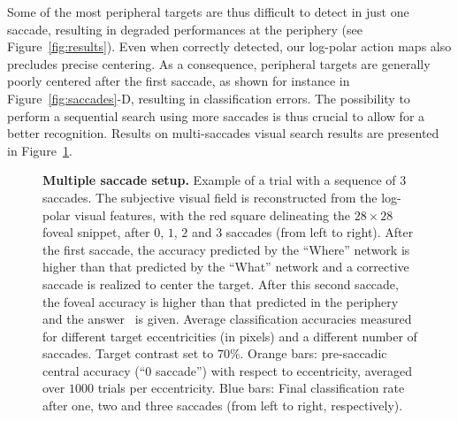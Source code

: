 Some of the most peripheral targets are thus difficult to detect in just one saccade, resulting in degraded performances at the periphery (see Figure~\ref{fig:results}). Even when correctly detected, our log-polar action maps also precludes precise centering. As a consequence, peripheral targets are generally poorly centered after the first saccade, as shown for instance in Figure~\ref{fig:saccades}-D, resulting in classification errors. The possibility to perform a sequential search using more saccades is thus crucial to allow for a better recognition. Results on multi-saccades visual search results are presented in Figure~\ref{fig:results-saccades}.

\begin{figure}[t!]%
	\caption{
		{\bf Multiple saccade setup.} %
		\A Example of a trial with a sequence of $3$ saccades. The subjective visual field is reconstructed from the log-polar visual features, with the red square delineating the $28\times28$ foveal snippet, after $0$, $1$, $2$ and $3$ saccades (from left to right). After the first saccade, the accuracy predicted by the ``Where'' network is higher than that predicted by the ``What'' network and a corrective saccade is realized to center the target. After this second saccade, the foveal accuracy is higher than that predicted in the periphery and the answer \ANS\ is given.
		\B Average classification accuracies measured for different target eccentricities (in pixels) and a different number of saccades. Target contrast set to $70\%$. Orange bars: pre-saccadic central accuracy (``0 saccade'') with respect to eccentricity, averaged over $1000$ trials per eccentricity. Blue bars: Final classification rate after one, two and three saccades (from left to right, respectively).
		\label{fig:results-saccades}}%
\end{figure}%
